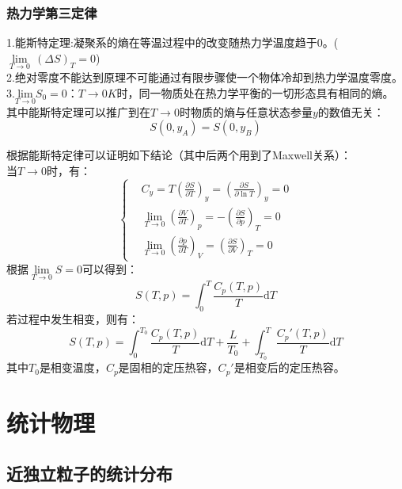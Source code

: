 \documentclass[12pt]{article}
\begin{document}
\subsubsection{热力学第三定律}	
\noindent
	1.能斯特定理:凝聚系的熵在等温过程中的改变随热力学温度趋于0。($ \underset{T\to 0}{\mathop{\lim }}\,{{(\Delta S)}_{T}}=0$)\\
	2.绝对零度不能达到原理不可能通过有限步骤使一个物体冷却到热力学温度零度。\\
	3.$\underset{T\to 0}{\mathrm{lim}}S_0=0$：$T\to 0K$时，同一物质处在热力学平衡的一切形态具有相同的熵。
	\\
其中能斯特定理可以推广到在$T\to 0$时物质的熵与任意状态参量$y$的数值无关：
\begin{equation}
	S(0,y_A)=S(0,y_B)
\end{equation}

\noindent 根据能斯特定律可以证明如下结论（其中后两个用到了Maxwell关系）：\\
当$T \to 0$时，有：
\begin{equation}
	\left \{
	\begin{split}
	&C_y=T(\frac{\partial S}{\partial T})_y=(\frac{\partial S}{\partial \ln T})_y=0\\
	&\underset{T\to 0}{\lim}(\frac{\partial V}{\partial T})_p=-(\frac{\partial S}{\partial p})_T=0\\
	&\underset{T\to 0}{\lim}(\frac{\partial p}{\partial T})_V=(\frac{\partial S}{\partial V})_T=0		
	\end{split}\right.
\end{equation}
根据$\underset{T\to 0}{\lim}S=0$可以得到：
\begin{equation}
	S(T,p)=\int_{0}^{T} \frac{C_p(T,p)}{T}\mathrm{d}T
\end{equation}
若过程中发生相变，则有：
\begin{equation}
	S(T,p)=\int_{0}^{T_0} \frac{C_p(T,p)}{T}\mathrm{d}T+\frac{L}{T_0}+\int_{T_0}^{T} \frac{C_p'(T,p)}{T}\mathrm{d}T
\end{equation}
其中$T_0$是相变温度，$C_p$是固相的定压热容，$C_p'$是相变后的定压热容。
\newpage
\section{统计物理}
\subsection{近独立粒子的统计分布}
\end{document}
